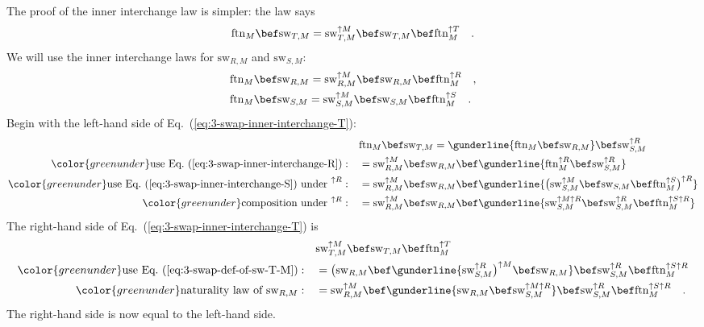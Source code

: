 The proof of the inner interchange law is simpler: the law says
\begin{equation}
\text{ftn}_{M}\bef\text{sw}_{T,M}=\text{sw}_{T,M}^{\uparrow M}\bef\text{sw}_{T,M}\bef\text{ftn}_{M}^{\uparrow T}\quad.\label{eq:3-swap-inner-interchange-T}
\end{equation}
We will use the inner interchange laws for $\text{sw}_{R,M}$ and
$\text{sw}_{S,M}$:
\begin{align}
 & \text{ftn}_{M}\bef\text{sw}_{R,M}=\text{sw}_{R,M}^{\uparrow M}\bef\text{sw}_{R,M}\bef\text{ftn}_{M}^{\uparrow R}\quad,\label{eq:3-swap-inner-interchange-R}\\
 & \text{ftn}_{M}\bef\text{sw}_{S,M}=\text{sw}_{S,M}^{\uparrow M}\bef\text{sw}_{S,M}\bef\text{ftn}_{M}^{\uparrow S}\quad.\label{eq:3-swap-inner-interchange-S}
\end{align}
Begin with the left-hand side of Eq.~(\ref{eq:3-swap-inner-interchange-T}):
\begin{align*}
 & \text{ftn}_{M}\bef\text{sw}_{T,M}=\gunderline{\text{ftn}_{M}\bef\text{sw}_{R,M}}\bef\text{sw}_{S,M}^{\uparrow R}\\
{\color{greenunder}\text{use Eq.~(\ref{eq:3-swap-inner-interchange-R})}:}\quad & =\text{sw}_{R,M}^{\uparrow M}\bef\text{sw}_{R,M}\bef\gunderline{\text{ftn}_{M}^{\uparrow R}\bef\text{sw}_{S,M}^{\uparrow R}}\\
{\color{greenunder}\text{use Eq.~(\ref{eq:3-swap-inner-interchange-S}) under }^{\uparrow R}:}\quad & =\text{sw}_{R,M}^{\uparrow M}\bef\text{sw}_{R,M}\bef\gunderline{\big(\text{sw}_{S,M}^{\uparrow M}\bef\text{sw}_{S,M}\bef\text{ftn}_{M}^{\uparrow S}\big)^{\uparrow R}}\\
{\color{greenunder}\text{composition under }^{\uparrow R}:}\quad & =\text{sw}_{R,M}^{\uparrow M}\bef\text{sw}_{R,M}\bef\gunderline{\text{sw}_{S,M}^{\uparrow M\uparrow R}\bef\text{sw}_{S,M}^{\uparrow R}\bef\text{ftn}_{M}^{\uparrow S\uparrow R}}
\end{align*}
The right-hand side of Eq.~(\ref{eq:3-swap-inner-interchange-T})
is 
\begin{align*}
 & \text{sw}_{T,M}^{\uparrow M}\bef\text{sw}_{T,M}\bef\text{ftn}_{M}^{\uparrow T}\\
{\color{greenunder}\text{use Eq.~(\ref{eq:3-swap-def-of-sw-T-M})}:}\quad & =\big(\text{sw}_{R,M}\bef\gunderline{\text{sw}_{S,M}^{\uparrow R}\big)^{\uparrow M}\bef\text{sw}_{R,M}}\bef\text{sw}_{S,M}^{\uparrow R}\bef\text{ftn}_{M}^{\uparrow S\uparrow R}\\
{\color{greenunder}\text{naturality law of }\text{sw}_{R,M}:}\quad & =\text{sw}_{R,M}^{\uparrow M}\bef\gunderline{\text{sw}_{R,M}\bef\text{sw}_{S,M}^{\uparrow M\uparrow R}}\bef\text{sw}_{S,M}^{\uparrow R}\bef\text{ftn}_{M}^{\uparrow S\uparrow R}\quad.
\end{align*}
The right-hand side is now equal to the left-hand side.

